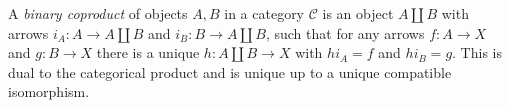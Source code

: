 
A \emph{binary coproduct} of objects $A,B$ in a category $\mathcal C$ is an object $A\amalg B$ with arrows $i_A:A\to A\amalg B$ and $i_B:B\to A\amalg B$, such that for any arrows $f:A\to X$ and $g:B\to X$ there is a unique $h:A\amalg B\to X$ with $h i_A=f$ and $h i_B=g$. This is dual to the categorical product and is unique up to a unique compatible isomorphism.
